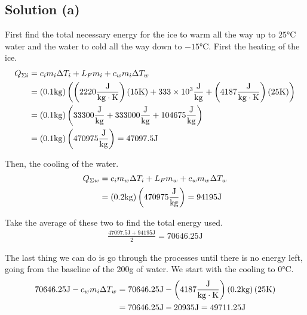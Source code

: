 \documentclass[12pt]{article}
\begin{document}
        \subsection{Solution (a)}
            First find the total necessary energy for the ice to warm all the way up to $25\unit{\celsius}$ water and the water to cold all the way down to $-15\unit{\celsius}$.
            First the heating of the ice.
            { \small
            \begin{align}
                Q_{\Sigma i}    &=  c_i m_i \Delta T_i + L_F m_i + c_w m_i \Delta T_w\\
                    &=  (0.1 \unit{\kilo\gram}) \left( \left( 2220 \unit{\frac{\joule}{\kilo\gram\cdot\kelvin}} \right) \left( 15 \unit{\kelvin} \right) + 333 \times 10^3 \unit{\frac{\joule}{\kilo\gram}} + \left( 4187 \unit{\frac{\joule}{\kilo\gram\cdot\kelvin}} \right) \left( 25 \unit{\kelvin} \right) \right)\\
                    &=  \left( 0.1 \unit{\kilo\gram} \right) \left( 33300 \unit{\frac{\joule}{\kilo\gram}} + 333000 \unit{\frac{\joule}{\kilo\gram}} + 104675 \unit{\frac{\joule}{\kilo\gram}} \right)\\
                    &=  (0.1 \unit{\kilo\gram}) \left( 470975 \unit{\frac{\joule}{\kilo\gram}} \right)
                    =   47097.5 \unit{\joule}
            \end{align}}

            Then, the cooling of the water.
            \begin{align}
                Q_{\Sigma w}    &=  c_i m_w \Delta T_i + L_F m_w + c_w m_w \Delta T_w\\
                    &=  (0.2 \unit{\kilo\gram}) \left( 470975 \unit{\frac{\joule}{\kilo\gram}} \right)
                    =   94195 \unit{\joule}
            \end{align}

            Take the average of these two to find the total energy used. 
            \begin{gather}
                \frac{47097.5 \unit{\joule} + 94195 \unit{\joule}}{2}   =   70646.25 \unit{\joule}
            \end{gather}

            The last thing we can do is go through the processes until there is no energy left, going from the baseline of the 200\unit{\gram} of water.
            We start with the cooling to 0\unit{\celsius}. 
            \begin{align}
                70646.25 \unit{\joule} - c_w m_i \Delta T_w
                    &=  70646.25 \unit{\joule} - \left( 4187 \unit{\frac{\joule}{\kilo\gram\cdot\kelvin}} \right) (0.2 \unit{\kilo\gram}) \left( 25 \unit{\kelvin} \right)\\
                    &=  70646.25 \unit{\joule} - 20935 \unit{\joule}
                    =   49711.25 \unit{\joule}
            \end{align}
\end{document}
